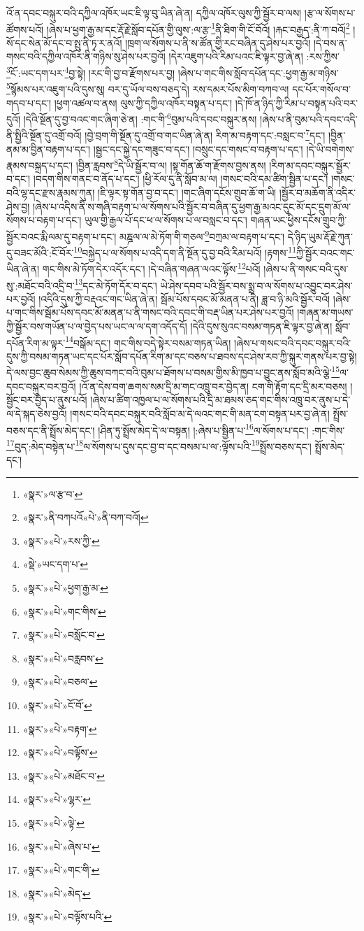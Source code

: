 འོ་ན་དབང་བསྐུར་བའི་དཀྱིལ་འཁོར་ཡང་ཇི་ལྟ་བུ་ཡིན་ཞེ་ན། དཀྱིལ་འཁོར་ལུས་ཀྱི་སྦྱོར་བ་ལས། །རྩ་ལ་སོགས་པ་ཚོགས་པའོ། །ཞེས་པ་ཕྱག་རྒྱ་མ་དང་རྡོ་རྗེ་སློབ་དཔོན་གྱི་ལུས་:ལ་རྩ་\footnote{«སྣར་»ལ་རྩ་བ་}ནི་ཐིག་གི་ངོ་བོའོ། །རྐང་བརྒྱད་:ནི་ཀ་བའོ།\footnote{«སྣར་»ནི་བཀཔའོ«པེ་»ནི་བཀ་བའོ།} །སོ་དང་སེན་མོ་དང་བ་སྤུ་ནི་ཏྭ་ར་ནའོ། །ཁྲག་ལ་སོགས་པ་ནི་ས་ཚོན་གྱི་རང་བཞིན་དུ་ཤེས་པར་བྱའོ། །དེ་བས་ན་གསང་བའི་དཀྱིལ་འཁོར་ནི་གཉིས་སུ་ཤེས་པར་བྱའོ། །དེར་འཇུག་པའི་རིམ་པའང་ཇི་ལྟར་བྱ་ཞེ་ན། :རས་ཀྱིས་\footnote{«སྣར་»«པེ་»རས་ཀྱི་}ངོ་:ཡང་དག་པར་\footnote{«སྡེ་»ཡང་དག་པ་}བྱ་སྟེ། །རང་གི་བྱ་བ་རྫོགས་པར་བྱ། །ཞེས་པ་གང་གིས་སློབ་དཔོན་དང་:ཕྱག་རྒྱ་མ་གཉིས་\footnote{«སྣར་»«པེ་»ཕྱག་རྒྱ་མ་}སྙོམས་པར་འཇུག་པའི་དུས་སུ། བར་དུ་ཡོལ་བས་བཅད་དེ། རས་དམར་པོས་མིག་བཀབ་ལ། དང་པོར་གསོལ་བ་གདབ་པ་དང་། །ཕྱག་འཚལ་བ་ནས། ལུས་ཀྱི་དཀྱིལ་འཁོར་བསྟན་པ་དང་། །དེ་ཁོ་ན་ཉིད་ཀྱི་རིམ་པ་བསྟན་པའི་བར་དུའོ། །དེའི་སྔོན་དུ་བྱ་བའང་གང་ཞིག་ཅེ་ན། :གང་གི་\footnote{«སྣར་»«པེ་»གང་གིས་}བུམ་པའི་དབང་བསྐུར་ནས། །ཞེས་པ་ནི་བུམ་པའི་དབང་འདི་ནི་སྤྱིའི་སྔོན་དུ་འགྲོ་བའོ། །བྱེ་བྲག་གི་སྔོན་དུ་འགྲོ་བ་གང་ཡིན་ཞེ་ན། རིག་མ་བརྟག་དང་:བསླང་བ་\footnote{«སྣར་»«པེ་»བསློང་བ་}དང་། །བྱིན་ནམ་མ་བྱིན་བརྟག་པ་དང་། །སྦྱང་དང་སྐྱེ་དང་གཟུང་བ་དང་། །བསྲུང་དང་གསང་བ་བརྟག་པ་དང་། །དེ་ཡི་བགེགས་རྣམས་བསྐྲད་པ་དང་། །བྱིན་རླབས་\footnote{«སྣར་»«པེ་»བརླབས་}དེ་ཡི་སྦྱོར་བ་ལ། །སྟ་གོན་ཆོ་ག་རྫོགས་བྱས་ནས། །རིག་མ་དབང་བསྐུར་སྦྱོར་བ་དང་། །བདག་གིས་གནང་བ་ནོད་པ་དང་། །ཕྱི་རོལ་དུ་ནི་སློབ་མ་ལ། །གསང་བའི་དམ་ཚིག་སྦྱིན་པ་དང་། །གསང་བའི་ལྷ་དང་རྫས་རྣམས་ཀུན། །ཇི་ལྟར་སྟ་གོན་བྱ་བ་དང་། །གང་ཞིག་དངོས་གྲུབ་ཆོ་ག་ཡི། །སྦྱོར་བ་མཆོག་ནི་འདིར་ཤེས་བྱ། །ཞེས་པ་འདིས་ནི་ས་གཞི་བརྟག་པ་ལ་སོགས་པའི་སྦྱོར་བ་བཞིན་དུ་ཕྱག་རྒྱ་མའང་དུང་མོ་དང་དྲུག་མོ་ལ་སོགས་པ་བརྟག་པ་དང་། ཡུལ་གྱི་རྒྱལ་པོ་དང་ཕ་ལ་སོགས་པ་ལ་བསླང་བ་དང་། གཞན་ཡང་ཕྱིས་དངོས་གྲུབ་ཀྱི་སྦྱོར་བའང་རྨི་ལམ་དུ་བརྟག་པ་དང་། མཎྜལ་ལ་མེ་ཏོག་གི་གཅལ་\footnote{«སྣར་»«པེ་»བཅལ་}བཀྲམ་ལ་བརྟག་པ་དང་། དེ་ཉིད་ཡུམ་རྡོ་རྗེ་ཀུན་དུ་བཟང་མོའི་:ངོ་བོར་\footnote{«སྣར་»«པེ་»ངོ་བོ་}བསྐྱེད་པ་ལ་སོགས་པ་འདི་དག་ནི་སྔོན་དུ་བྱ་བའི་རིམ་པའོ། །རྟགས་\footnote{«སྣར་»«པེ་»བརྟག་}ཀྱི་སྦྱོར་བའང་གང་ཡིན་ཞེ་ན། གང་གིས་མེ་ཏོག་དེར་འདོར་དང་། །དེ་བཞིན་གཞན་ལའང་ལྟོས་\footnote{«སྣར་»«པེ་»བལྟོས་}པའོ། །ཞེས་པ་ནི་གསང་བའི་དུས་སུ་:མཐོང་བའི་འདྲི་བ་\footnote{«སྣར་»«པེ་»མཐོང་བ་}དང་མེ་ཏོག་དོར་བ་དང་། ཡེ་ཤེས་དབབ་པའི་སྦྱོར་བས་སྨྲ་བ་ལ་སོགས་པ་འབྱུང་བར་ཤེས་པར་བྱའོ། །འདིའི་དུས་ཀྱི་བརྡའང་གང་ཡིན་ཞེ་ན། སྦོམ་པོས་དབང་མོ་མནན་པ་ནི། ཟླ་བ་ཉི་མའི་སྦྱོར་བའོ། །ཞེས་པ་གང་གིས་སྦོམ་པོས་དབང་མོ་མནན་པ་ནི་གསང་བའི་དབང་གི་བརྡ་ཡིན་པར་ཤེས་པར་བྱའོ། །གཞན་མ་གཡས་ཀྱི་སྦྱོར་བས་གཡོན་པ་ལ་བྱེད་པས་ཡང་ལ་ལ་དག་འདོད་དོ། །དེའི་དུས་སུའང་བསམ་གཏན་ཇི་ལྟར་བྱ་ཞེ་ན། སློབ་དཔོན་རིག་མ་ལྟར་\footnote{«སྣར་»«པེ་»ལྷར་}བསྒོམ་དང་། གང་གིས་བདེ་སྟེར་བསམ་གཏན་ཡིན། །ཞེས་པ་གསང་བའི་དབང་བསྐུར་བའི་དུས་ཀྱི་བསམ་གཏན་ཡང་དང་པོར་སློབ་དཔོན་རིག་མ་དང་བཅས་པ་ཐབས་དང་ཤེས་རབ་ཀྱི་སྐུར་གནས་པར་བྱ་སྟེ། དེ་ལས་བྱང་ཆུབ་སེམས་ཀྱི་ཆུས་བཀང་བའི་བུམ་པ་ཐོགས་པ་བསམ་གྱིས་མི་ཁྱབ་པ་བྱུང་ནས་སློབ་མའི་ལྕེ་\footnote{«སྣར་»«པེ་»ལྟེ་}ལ་དབང་བསྐུར་བར་བྱའོ། །འོ་ན་དེས་བག་ཆགས་སམ་དྲི་མ་གང་འཁྲུ་བར་བྱེད་ན། ངག་གི་རྟོག་དང་དྲི་མར་བཅས། །སྦྱོང་བར་བྱེད་པ་ནུས་པའོ། །ཞེས་པ་ཚིག་འཁྱལ་པ་ལ་སོགས་པའི་དྲི་མ་ཐམས་ཅད་གང་གིས་འཁྲུ་བར་ནུས་པ་དེ་ལ་དེ་སྐད་ཅེས་བྱའོ། །གསང་བའི་དབང་བསྐུར་བའི་སློབ་མ་དེ་ལའང་གང་གི་མན་ངག་བསྟན་པར་བྱ་ཞེ་ན། སྤྲོས་བཅས་དང་ནི་སྤྲོས་མེད་དང་། །ཤིན་ཏུ་སྤྲོས་མེད་དེ་ལ་བསྟན། །:ཞེས་པ་སྦྱིན་པ་\footnote{«སྣར་»«པེ་»ཞེས་པ་}ལ་སོགས་པ་དང་། :གང་གིས་\footnote{«སྣར་»«པེ་»གང་གི་}བུད་:མེད་བསྟེན་པ་\footnote{«སྣར་»«པེ་»མེད་}ལ་སོགས་པ་དུས་དང་བྱ་བ་དང་བསམ་པ་ལ་:ལྟོས་པའི་\footnote{«སྣར་»«པེ་»བལྟོས་པའི་}སྤྲོས་བཅས་དང་། སྤྲོས་མེད་དང་། 